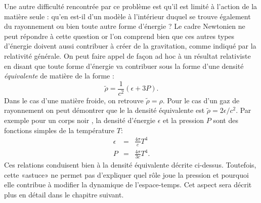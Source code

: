 Une autre difficulté rencontrée par ce problème est qu'il est limité à l'action de la matière seule : qu'en est-il d'un modèle à l'intérieur duquel se trouve également du rayonnement ou bien toute autre forme d'énergie ? Le cadre Newtonien ne peut répondre à cette question or l'on comprend bien que ces autres types d'énergie doivent aussi contribuer à créer de la gravitation, comme indiqué par la relativité générale. On peut faire appel de façon ad hoc à un résultat relativiste en disant que toute forme d'énergie va contribuer sous la forme d'une densité \textit{équivalente} de matière de la forme :
\begin{equation}
\tilde \rho= \frac{1}{c^2}(\epsilon + 3P).
\end{equation}
Dans le cas d'une matière froide, on retrouve $\tilde \rho =\rho$. Pour le cas d'un gaz de rayonnement on peut démontrer que le la densité équivalente est $\tilde \rho =2\epsilon/c^2$. Par exemple pour un corps noir , la densité d'énergie $\epsilon$ et la pression $P$ sont des fonctions simples de la température  $T$:
\begin{eqnarray}
\epsilon&=&\frac{4\sigma}{c} T^4\\
P&=&\frac{4\sigma}{3c} T^4.
\end{eqnarray}
Ces relations conduisent bien à la densité équivalente décrite ci-dessus. Toutefois, cette «astuce» ne permet pas d'expliquer quel rôle joue la pression et pourquoi elle contribue à modifier la dynamique de l'espace-temps. Cet aspect sera décrit plus en détail dans le chapitre suivant.

